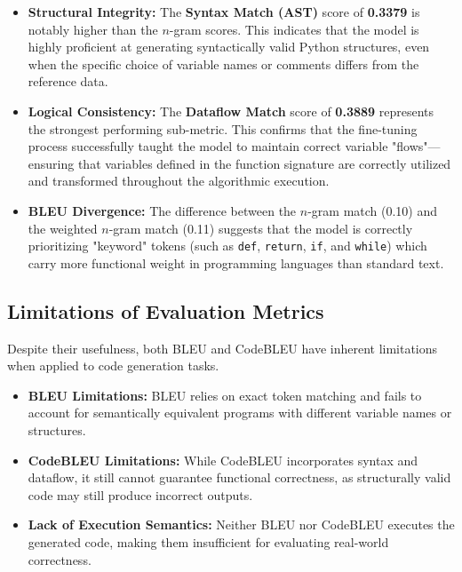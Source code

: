 \begin{itemize}
    \item \textbf{Structural Integrity:} The \textbf{Syntax Match (AST)} score of \textbf{0.3379} is notably higher than the $n$-gram scores. This indicates that the model is highly proficient at generating syntactically valid Python structures, even when the specific choice of variable names or comments differs from the reference data.
    
    

    \item \textbf{Logical Consistency:} The \textbf{Dataflow Match} score of \textbf{0.3889} represents the strongest performing sub-metric. This confirms that the fine-tuning process successfully taught the model to maintain correct variable "flows"—ensuring that variables defined in the function signature are correctly utilized and transformed throughout the algorithmic execution.
    
    

    \item \textbf{BLEU Divergence:} The difference between the $n$-gram match (0.10) and the weighted $n$-gram match (0.11) suggests that the model is correctly prioritizing "keyword" tokens (such as \texttt{def}, \texttt{return}, \texttt{if}, and \texttt{while}) which carry more functional weight in programming languages than standard text.
\end{itemize}

\subsection{Limitations of Evaluation Metrics}

Despite their usefulness, both BLEU and CodeBLEU have inherent limitations when applied to code generation tasks.

\begin{itemize}
    \item \textbf{BLEU Limitations:} BLEU relies on exact token matching and fails to account for semantically equivalent programs with different variable names or structures.
    
    \item \textbf{CodeBLEU Limitations:} While CodeBLEU incorporates syntax and dataflow, it still cannot guarantee functional correctness, as structurally valid code may still produce incorrect outputs.
    
    \item \textbf{Lack of Execution Semantics:} Neither BLEU nor CodeBLEU executes the generated code, making them insufficient for evaluating real-world correctness.
\end{itemize}


